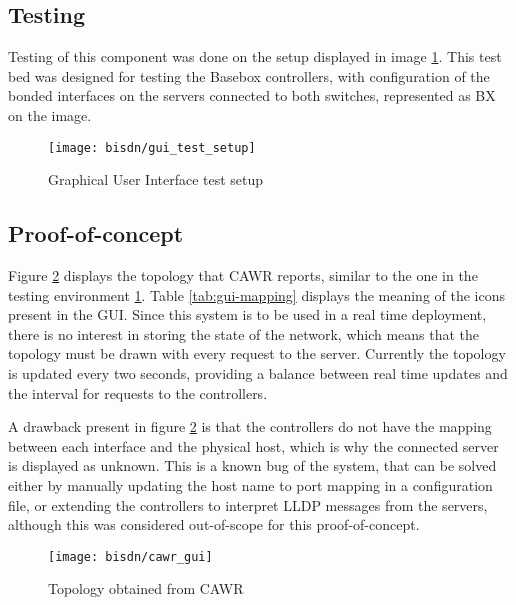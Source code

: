 \subsection{Testing}

\par Testing of this component was done on the setup displayed in image \ref{fig:gui_test_setup}. This test bed was designed for testing the Basebox controllers,
with configuration of the bonded interfaces on the servers connected to both switches, represented as BX on the image.  

\begin{figure}[H]
    \centering
    \texttt{[image: bisdn/gui\_test\_setup]}
    \caption{Graphical User Interface test setup}
    \label{fig:gui_test_setup}
\end{figure}

\subsection{Proof-of-concept}

\par Figure \ref{fig:cawr_gui} displays the topology that CAWR reports, similar to the one in the testing environment \ref{fig:gui_test_setup}. Table
\ref{tab:gui-mapping} displays the meaning of the icons present in the GUI. Since this system is to be used in a real time deployment, there is no interest in
storing the state of the network, which means that the topology must be drawn with every request to the server. Currently the topology is updated every two seconds,
providing a balance between real time updates and the interval for requests to the controllers.

\par A drawback present in figure \ref{fig:cawr_gui} is that the controllers do not have the mapping between each interface and the physical host, which is why 
the connected server is displayed as unknown. This is a known bug of the system, that can be solved either by manually updating the host name to port mapping in
a configuration file, or extending the controllers to interpret LLDP messages from the servers, although this was considered out-of-scope for this proof-of-concept.

\begin{figure} [H]
        \centering
        \texttt{[image: bisdn/cawr\_gui]}
        \caption{Topology obtained from CAWR}
        \label{fig:cawr_gui}
\end{figure}

